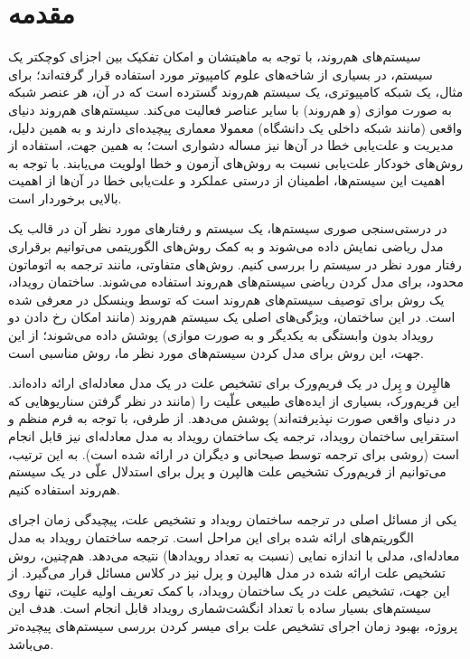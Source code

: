\section{مقدمه}
سیستم‌های هم‌روند، با توجه به ماهیتشان
و امکان تفکیک بین اجزای کوچکتر یک سیستم،
در بسیاری از شاخه‌های علوم کامپیوتر مورد
استفاده قرار گرفته‌اند؛ برای مثال، یک شبکه
کامپیوتری، یک سیستم هم‌روند گسترده است که
در آن، هر عنصر شبکه به صورت موازی
(و هم‌روند)
با سایر عناصر فعالیت می‌کند. سیستم‌های
هم‌روند دنیای واقعی
(مانند شبکه داخلی یک دانشگاه)
معمولا معماری پیچیده‌ای دارند
و به همین دلیل، مدیریت و علت‌یابی خطا در
آن‌ها نیز مساله دشواری است؛ به همین جهت،
استفاده از روش‌های خودکار علت‌یابی نسبت
به روش‌های آزمون و خطا اولویت می‌یابند.
با توجه به اهمیت این سیستم‌ها، اطمینان از
درستی عملکرد و علت‌یابی خطا در آن‌ها از
اهمیت بالایی برخوردار است.


در درستی‌سنجی صوری سیستم‌ها، یک سیستم و
رفتارهای مورد نظر آن در قالب یک مدل ریاضی
نمایش داده می‌شوند و به کمک روش‌های
الگوریتمی می‌توانیم برقراری رفتار مورد نظر
در سیستم را بررسی کنیم. روش‌های متفاوتی،
مانند ترجمه به اتوماتون محدود، برای مدل
کردن ریاضی سیستم‌های هم‌روند استفاده
می‌شوند. ساختمان رویداد، یک روش برای توصیف
سیستم‌های هم‌روند است که توسط وینسکل در
\cite{winskel1987event,winskel1989introduction}
معرفی شده است. در این ساختمان،
ویژگی‌های اصلی یک سیستم هم‌روند 
(مانند امکان رخ دادن دو رویداد بدون وابستگی به یکدیگر و به صورت موازی)
پوشش داده می‌شوند؛ از این جهت، این روش
برای مدل کردن سیستم‌های مورد نظر ما، روش
مناسبی است.

هالپِرن و پِرل ‌در
\cite{halpern2001causes}
یک فریم‌ورک برای تشخیص علت‌
در یک مدل معادله‌ای ارائه داده‌اند.
این فریم‌ورک، بسیاری از ایده‌های طبیعی علّیت را
(مانند در نظر گرفتن سناریوهایی که در دنیای واقعی صورت نپذیرفته‌اند)
پوشش می‌دهد. از طرفی، با توجه به فرم منظم و
استقرایی ساختمان رویداد، ترجمه یک ساختمان رویداد
به مدل معادله‌ای نیز قابل انجام است
(روشی برای ترجمه توسط صیحانی و دیگران در
\cite{seyhani2022}
ارائه شده است).
به این ترتیب، می‌توانیم از فریم‌ورک تشخیص علت
هالپرن و پرل برای استدلال علّی در
یک سیستم هم‌روند استفاده کنیم.

یکی از مسائل اصلی در ترجمه ساختمان رویداد
و تشخیص علت‌، پیچیدگی زمان اجرای الگوریتم‌های
ارائه شده برای این مراحل است. ترجمه ساختمان رویداد
به مدل معادله‌ای، مدلی با اندازه نمایی 
(نسبت به تعداد رویدادها)
نتیجه می‌دهد. هم‌چنین، روش تشخیص علت ارائه شده
در مدل هالپرن و پرل نیز در کلاس مسائل
قرار می‌گیرد. از این جهت، تشخیص علت در
یک ساختمان رویداد، با کمک تعریف اولیه علیت،
تنها روی سیستم‌های بسیار ساده
با تعداد انگشت‌شماری رویداد قابل انجام است.
هدف این پروژه، بهبود زمان اجرای تشخیص علت
برای میسر کردن بررسی سیستم‌های پیچیده‌تر می‌باشد.

